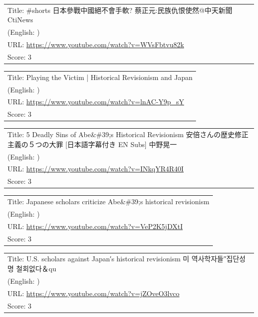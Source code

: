 \documentclass{article}
\begin{document}
\noindent
\begin{tabular}{p{}}
Title: \#shorts 日本參戰中國絕不會手軟? 蔡正元:民族仇恨使然@中天新聞CtiNews \\
(English: ) \\
URL: \url{https://www.youtube.com/watch?v=WVsFbtvu82k} \\
Score: 3 \\
\end{tabular}
\vspace{0.5em}

\noindent
\begin{tabular}{p{}}
Title: Playing the Victim | Historical Revisionism and Japan \\
(English: ) \\
URL: \url{https://www.youtube.com/watch?v=lnAC-Y9p_sY} \\
Score: 3 \\
\end{tabular}
\vspace{0.5em}

\noindent
\begin{tabular}{p{}}
Title: 5 Deadly Sins of Abe\&\#39;s Historical Revisionism 安倍さんの歴史修正主義の５つの大罪 [日本語字幕付き EN Subs] 中野晃一 \\
(English: ) \\
URL: \url{https://www.youtube.com/watch?v=INkqYR4R40I} \\
Score: 3 \\
\end{tabular}
\vspace{0.5em}

\noindent
\begin{tabular}{p{}}
Title: Japanese scholars criticize Abe\&\#39;s historical revisionism \\
(English: ) \\
URL: \url{https://www.youtube.com/watch?v=VeP2K5jDXtI} \\
Score: 3 \\
\end{tabular}
\vspace{0.5em}

\noindent
\begin{tabular}{p{}}
Title: U.S. scholars against Japan′s historical revisionism   미 역사학자들″집단성명 철회없다＆qu \\
(English: ) \\
URL: \url{https://www.youtube.com/watch?v=jZOveO3lvco} \\
Score: 3 \\
\end{tabular}
\vspace{0.5em}
\end{document}

